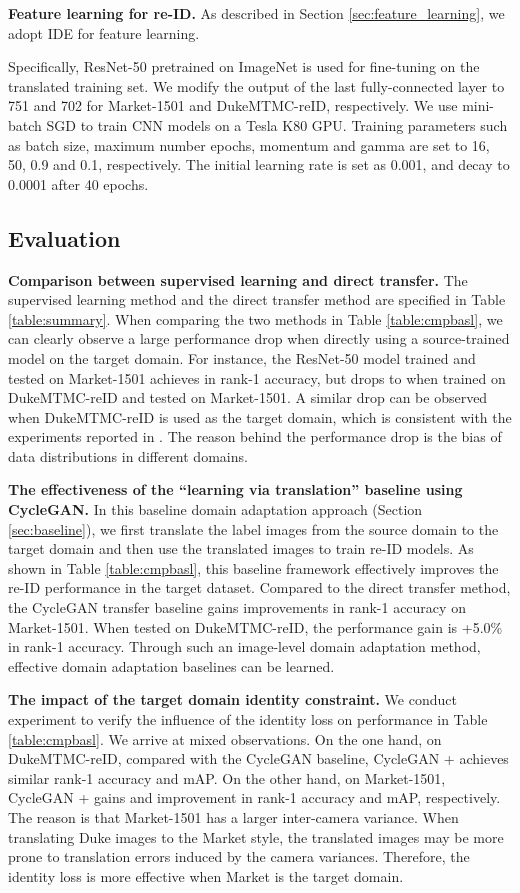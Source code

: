 \documentclass[10pt,twocolumn,letterpaper]{article}
\begin{document}
{\textbf{Feature learning for re-ID.} As described in Section \ref{sec:feature_learning}, we adopt IDE for feature learning.

Specifically, ResNet-50 \cite{DBLP:conf/cvpr/HeZRS16} pretrained on ImageNet is used for fine-tuning on the translated training set. We modify the output of the last fully-connected layer to 751 and 702 for Market-1501 and DukeMTMC-reID, respectively. 
We use mini-batch SGD to train CNN models on a Tesla K80 GPU. Training parameters such as batch size, maximum number epochs, momentum and gamma are set to 16, 50, 0.9 and 0.1, respectively. The initial learning rate is set as 0.001, and decay to 0.0001 after 40 epochs. 

\subsection{Evaluation} \label{compar baseline}

 \textbf{Comparison between  supervised learning and direct transfer.} The supervised learning method and the direct transfer method are specified in Table \ref{table:summary}. When comparing the two methods in Table \ref{table:cmpbasl}, we can clearly observe a large performance drop when directly using a source-trained model on the target domain. For instance,  
 the ResNet-50 model trained and tested on Market-1501 achieves  in rank-1 accuracy, but drops to  when trained on DukeMTMC-reID and tested on Market-1501. A similar drop can be observed when DukeMTMC-reID is used as the target domain, which is consistent with the experiments reported in \cite{fan17unsupervised}. The reason behind the performance drop is the bias of data distributions in different domains.

\textbf{The effectiveness of the ``learning via translation'' baseline using CycleGAN.} In this baseline domain adaptation approach (Section \ref{sec:baseline}), we first translate the label images from the source domain to the target domain and then use the translated images to train re-ID models. As shown in Table \ref{table:cmpbasl}, this baseline framework effectively improves the re-ID performance  in the target dataset. Compared to the direct transfer method, the CycleGAN transfer baseline gains  improvements in rank-1 accuracy on  Market-1501. When tested on DukeMTMC-reID, the performance gain is +5.0\% in rank-1 accuracy.
{Through such an image-level domain adaptation method,   effective domain adaptation baselines can be learned.} 

\textbf{The impact of the target domain identity constraint.} 
We conduct experiment to verify the influence of the identity loss on performance in Table \ref{table:cmpbasl}.
We arrive at mixed observations. On the one hand, on DukeMTMC-reID, compared with the CycleGAN baseline, CycleGAN +  achieves similar rank-1 accuracy and mAP. On the other hand, on Market-1501, CycleGAN +  gains  and  improvement in rank-1 accuracy and mAP, respectively. The reason is that Market-1501 has a larger inter-camera variance. When translating Duke images to the Market style, the translated images may be more prone to translation errors induced by the camera variances. Therefore, the identity loss is more effective when Market is the target domain.

}
\end{document}
